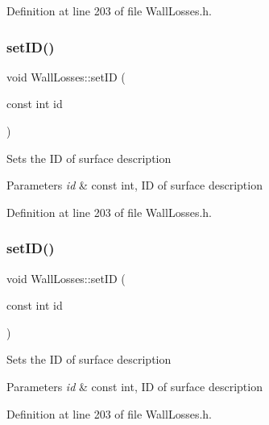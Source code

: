 Definition at line 203 of file Wall\+Losses.\+h.

\mbox{\label{class_wall_losses_a3a135d9bfd6c6f1c4742031ab568b26d}} 
\subsubsection{\texorpdfstring{set\+I\+D()}{setID()}\hspace{0.1cm}{\footnotesize\ttfamily [2/3]}}
{\footnotesize\ttfamily void Wall\+Losses\+::set\+ID (\begin{DoxyParamCaption}\item[{const int}]{id }\end{DoxyParamCaption})\hspace{0.3cm}{\ttfamily [inline]}}

Sets the ID of surface description 
\begin{DoxyParams}{Parameters}
{\em id} & const int, ID of surface description \\
\hline
\end{DoxyParams}


Definition at line 203 of file Wall\+Losses.\+h.

\mbox{\label{class_wall_losses_a3a135d9bfd6c6f1c4742031ab568b26d}} 
\subsubsection{\texorpdfstring{set\+I\+D()}{setID()}\hspace{0.1cm}{\footnotesize\ttfamily [3/3]}}
{\footnotesize\ttfamily void Wall\+Losses\+::set\+ID (\begin{DoxyParamCaption}\item[{const int}]{id }\end{DoxyParamCaption})\hspace{0.3cm}{\ttfamily [inline]}}

Sets the ID of surface description 
\begin{DoxyParams}{Parameters}
{\em id} & const int, ID of surface description \\
\hline
\end{DoxyParams}


Definition at line 203 of file Wall\+Losses.\+h.

